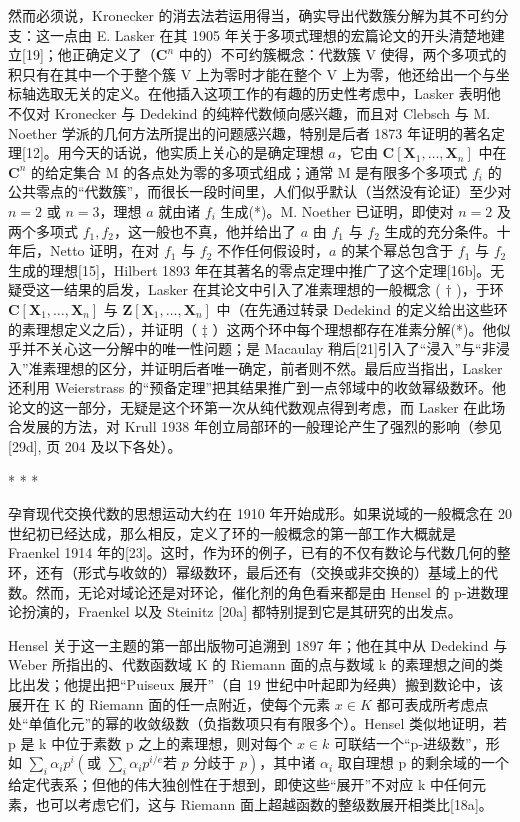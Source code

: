 然而必须说，Kronecker 的消去法若运用得当，确实导出代数簇分解为其不可约分支：这一点由 E. Lasker 在其 1905 年关于多项式理想的宏篇论文的开头清楚地建立{[}19{]}；他正确定义了（\(\mathbf{C}^n\) 中的）不可约簇概念：代数簇 V 使得，两个多项式的积只有在其中一个于整个簇 V 上为零时才能在整个 V 上为零，他还给出一个与坐标轴选取无关的定义。在他插入这项工作的有趣的历史性考虑中，Lasker 表明他不仅对 Kronecker 与 Dedekind 的纯粹代数倾向感兴趣，而且对 Clebsch 与 M. Noether 学派的几何方法所提出的问题感兴趣，特别是后者 1873 年证明的著名定理{[}12{]}。用今天的话说，他实质上关心的是确定理想 \(a\)，它由 \(\mathbf{C}[\mathbf{X}_1,\ldots ,\mathbf{X}_n]\) 中在 \(\mathbf{C}^n\) 的给定集合 M 的各点处为零的多项式组成；通常 M 是有限多个多项式 \(f_{i}\) 的公共零点的“代数簇”，而很长一段时间里，人们似乎默认（当然没有论证）至少对 \(n = 2\) 或 \(n = 3\)，理想 \(a\) 就由诸 \(f_{i}\) 生成(*)。M. Noether 已证明，即使对 \(n = 2\) 及两个多项式 \(f_{1},f_{2}\)，这一般也不真，他并给出了 \(a\) 由 \(f_{1}\) 与 \(f_{2}\) 生成的充分条件。十年后，Netto 证明，在对 \(f_{1}\) 与 \(f_{2}\) 不作任何假设时，\(a\) 的某个幂总包含于 \(f_{1}\) 与 \(f_{2}\) 生成的理想{[}15{]}，Hilbert 1893 年在其著名的零点定理中推广了这个定理{[}16b{]}。无疑受这一结果的启发，Lasker 在其论文中引入了准素理想的一般概念 ( \(\dagger\) )，于环 \(\mathbf{C}[\mathbf{X}_1,\dots ,\mathbf{X}_n]\) 与 \(\mathbf{Z}[\mathbf{X}_1,\dots ,\mathbf{X}_n]\) 中（在先通过转录 Dedekind 的定义给出这些环的素理想定义之后），并证明（ \(\ddagger\) ）这两个环中每个理想都存在准素分解(*)。他似乎并不关心这一分解中的唯一性问题；是 Macaulay 稍后{[}21{]}引入了“浸入”与“非浸入”准素理想的区分，并证明后者唯一确定，前者则不然。最后应当指出，Lasker 还利用 Weierstrass 的“预备定理”把其结果推广到一点邻域中的收敛幂级数环。他论文的这一部分，无疑是这个环第一次从纯代数观点得到考虑，而 Lasker 在此场合发展的方法，对 Krull 1938 年创立局部环的一般理论产生了强烈的影响（参见{[}29d{]}, 页 204 及以下各处）。

\begin{center}* * *\end{center}

孕育现代交换代数的思想运动大约在 1910 年开始成形。如果说域的一般概念在 20 世纪初已经达成，那么相反，定义了环的一般概念的第一部工作大概就是 Fraenkel 1914 年的{[}23{]}。这时，作为环的例子，已有的不仅有数论与代数几何的整环，还有（形式与收敛的）幂级数环，最后还有（交换或非交换的）基域上的代数。然而，无论对域论还是对环论，催化剂的角色看来都是由 Hensel 的 p-进数理论扮演的，Fraenkel 以及 Steinitz {[}20a{]} 都特别提到它是其研究的出发点。

Hensel 关于这一主题的第一部出版物可追溯到 1897 年；他在其中从 Dedekind 与 Weber 所指出的、代数函数域 K 的 Riemann 面的点与数域 k 的素理想之间的类比出发；他提出把“Puiseux 展开”（自 19 世纪中叶起即为经典）搬到数论中，该展开在 K 的 Riemann 面的任一点附近，使每个元素 \(x \in K\) 都可表成所考虑点处“单值化元”的幂的收敛级数（负指数项只有有限多个）。Hensel 类似地证明，若 p 是 k 中位于素数 p 之上的素理想，则对每个 \(x \in k\) 可联结一个“p-进级数”，形如 \(\sum_{i} \alpha_{i} p^{i} \left( \text{或 } \sum_{i} \alpha_{i} p^{i/e} \text{若 } p \text{ 分歧于 } p \right)\)，其中诸 \(\alpha_{i}\) 取自理想 p 的剩余域的一个给定代表系；但他的伟大独创性在于想到，即使这些“展开”不对应 k 中任何元素，也可以考虑它们，这与 Riemann 面上超越函数的整级数展开相类比{[}18a{]}。

